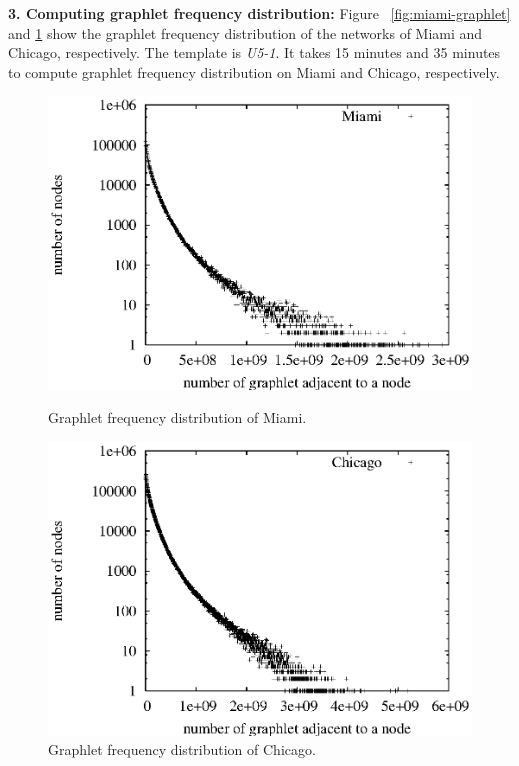 \smallskip
\textbf{3. Computing graphlet frequency distribution:} Figure
~\ref{fig:miami-graphlet} and \ref{fig:chicago-graphlet} show the graphlet
frequency distribution of the networks of Miami and Chicago, respectively. The
template is \emph{U5-1}. It takes 15 minutes and 35 minutes to compute graphlet
frequency distribution on Miami and Chicago, respectively.

\begin{figure}[htbp]
\hfill
\begin{minipage}[t]{0.45\linewidth}
\begin{center}
\centerline{\includegraphics[scale=0.35]{plots/miami-graphlet.eps}}
\caption{Graphlet frequency distribution of Miami.}
\label{fig:miami-graphlet}
\end{center}
\end{minipage}
\hfill
\begin{minipage}[t]{0.45\linewidth}
\begin{center}
\centerline{\includegraphics[scale=0.35]{plots/chicago-graphlet.eps}}
\caption{Graphlet frequency distribution of Chicago.}
\label{fig:chicago-graphlet}
\end{center}
\end{minipage}
\hfill
\end{figure}




